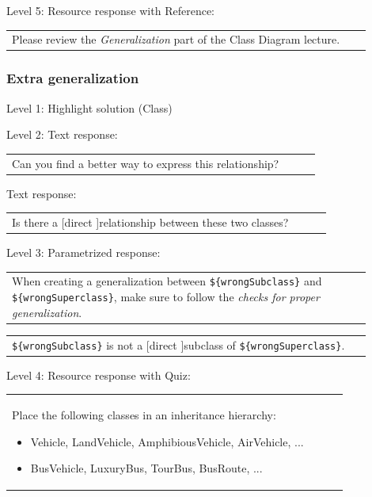 \noindent Level 5: Resource response with Reference: \medskip

\begin{tabular}{|p{0.9\linewidth}}
Please review the \textit{Generalization} part of the Class Diagram lecture.
\end{tabular} \medskip


\subsubsection{Extra generalization}

\noindent Level 1: Highlight solution (Class) \medskip

\noindent Level 2: Text response: \medskip

\begin{tabular}{|p{0.9\linewidth}}
Can you find a better way to express this relationship?
\end{tabular} \medskip

Text response: \medskip

\begin{tabular}{|p{0.9\linewidth}}
Is there a [direct ]relationship between these two classes?
\end{tabular} \medskip

\noindent Level 3: Parametrized response: \medskip

\begin{tabular}{|p{0.9\linewidth}}
When creating a generalization between \verb|${wrongSubclass}| and \verb|${wrongSuperclass}|, make sure to follow the \textit{checks for proper generalization}.
\end{tabular} \medskip

\begin{tabular}{|p{0.9\linewidth}}
\verb|${wrongSubclass}| is not a [direct ]subclass of \verb|${wrongSuperclass}|.
\end{tabular} \medskip

\noindent Level 4: Resource response with Quiz: \medskip

\begin{tabular}{|p{0.9\linewidth}}
Place the following classes in an inheritance hierarchy:

\begin{itemize}
    \item Vehicle, LandVehicle, AmphibiousVehicle, AirVehicle, ...
    \item BusVehicle, LuxuryBus, TourBus, BusRoute, ...
\end{itemize}

\end{tabular} \medskip

